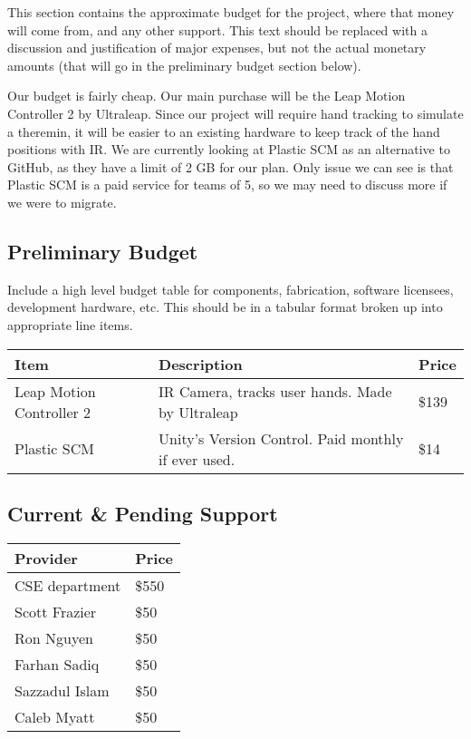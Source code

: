 This section contains the approximate budget for the project, where that money will come from, and any other support. This text should be replaced with a discussion and justification of major expenses, but not the actual monetary amounts (that will go in the preliminary budget section below). 

Our budget is fairly cheap. Our main purchase will be the Leap Motion Controller 2 by Ultraleap. Since our project will require hand tracking to simulate a theremin, it will be easier to an existing hardware to keep track of the hand positions with IR. We are currently looking at Plastic SCM as an alternative to GitHub, as they have a limit of 2 GB for our plan. Only issue we can see is that Plastic SCM is a paid service for teams of 5, so we may need to discuss more if we were to migrate.

\subsection{Preliminary Budget}
Include a high level budget table for components, fabrication, software licensees, development hardware, etc. This should be in a tabular format broken up into appropriate line items. 
\begin{center}
\begin{tabular}{|l|l|l|}
\hline
\textbf{Item} & \textbf{Description} & \textbf{Price}  \\ \hline
Leap Motion Controller 2 & IR Camera, tracks user hands. Made by Ultraleap & \$139  \\ \hline
Plastic SCM & Unity's Version Control. Paid monthly if ever used. & \$14  \\ \hline
\end{tabular}
\end{center}


\subsection{Current \& Pending Support}

\begin{center}
\begin{tabular}{|l|l|}
\hline
\textbf{Provider} & \textbf{Price}  \\ \hline
CSE department &  \$550  \\ \hline
Scott Frazier &  \$50  \\ \hline
Ron Nguyen &  \$50  \\ \hline
Farhan Sadiq &  \$50  \\ \hline
Sazzadul Islam &  \$50  \\ \hline
Caleb Myatt &  \$50  \\ \hline

\end{tabular}  
\end{center}
